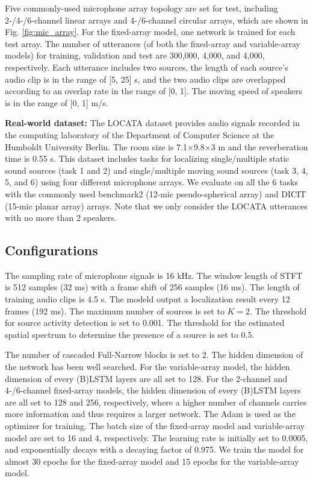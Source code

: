 \documentclass[lettersize,journal]{IEEEtran}
\begin{document}
Five commonly-used microphone array topology are set for test, including 2-/4-/6-channel linear arrays and 4-/6-channel circular arrays, which are shown in Fig. \ref{fig:mic_array}. For the fixed-array model, one network is trained for each test array. The number of utterances (of both the fixed-array and variable-array models) for training, validation and test are 300,000, 4,000, and 4,000, respectively. Each utterance includes two sources, the length of each source's audio clip is in the range of [5, 25] s, and the two audio clips are overlapped according to an overlap rate in the range of [0, 1]. The moving speed of speakers is in the range of [0, 1] m/s.

\textbf{Real-world dataset: } The LOCATA\cite{Lllmann2018TheLC} dataset provides audio signals recorded in the computing laboratory of the Department of Computer Science at the Humboldt University Berlin. The room size is 7.1×9.8×3 m and the reverberation time is 0.55 s. This dataset includes tasks for localizing single/multiple static sound sources (task 1 and 2) and single/multiple moving sound sources (task 3, 4, 5, and 6) using four different microphone arrays. 
We evaluate on all the 6 tasks with the commonly used benchmark2 (12-mic pseudo-spherical array) and DICIT (15-mic planar array) \cite{Brutti2010WOZAD} arrays. Note that we only consider the LOCATA utterances with no more than 2 speakers.

\subsection{Configurations}
The sampling rate of microphone signals is 16 kHz. The window length of STFT is 512 samples (32 ms) with a frame shift of 256 samples (16 ms). The length of training audio clips is 4.5 s. The modeld output a localization result every 12 frames (192 ms). The maximum number of sources is set to $K=2$. The threshold for source activity detection is set to 0.001. The threshold for the  estimated spatial spectrum to determine the presence of a source is set to 0.5.

The number of cascaded Full-Narrow blocks is set to 2. The hidden dimension of the network has been well searched. For the variable-array model, the hidden dimension of every (B)LSTM layers are all set to 128. For the 2-channel and 4-/6-channel fixed-array models, the hidden dimension of every (B)LSTM layers are all set to 128 and 256, respectively, where a higher number of channels carries more information and thus requires a larger network.  
The Adam \cite{Kingma2014AdamAM} is used as the optimizer for training. The batch size of the fixed-array model and variable-array model are set to 16 and 4, respectively. The learning rate is initially set to 0.0005, and exponentially decays with a decaying factor of 0.975. We train the model for almost 30 epochs for the fixed-array model and 15 epochs for the variable-array model.  
\end{document}
